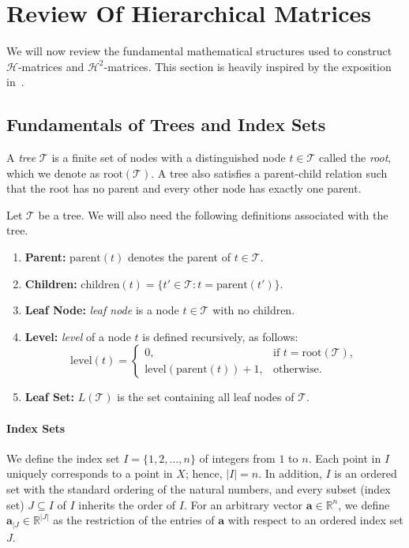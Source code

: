 \documentclass[final,3p,times]{elsarticle}
\newcommand{\mc}[1]{\mathcal{#1}}
\renewcommand{\vec}[1]{\boldsymbol{#1}}
\newcommand{\R}{\mathbb{R}}
\begin{document}
\section{Review Of Hierarchical Matrices}\label{sec:H_matrix_review}
We will now review the fundamental mathematical structures used to construct $\mc{H}$-matrices and $\mc{H}^{2}$-matrices. This section is heavily inspired by the  exposition in~\cite{borm2003introduction, BORM2025106190}.




\subsection{Fundamentals of Trees and Index Sets}\label{ssec:FOT}
A \textit{tree} $\mathcal{T}$ is a finite set of nodes with a distinguished node $t \in \mathcal{T}$ called the \textit{root}, which we denote as $\text{root}(\mc{T})$. A tree also satisfies a parent-child relation such that the root has no parent and every other node has exactly one parent. 

Let $\mathcal{T}$ be a tree. We will also need the following definitions associated with the tree. 
\begin{enumerate}
    \item \textbf{Parent:}  $\text{parent}(t)$ denotes the parent of $t \in \mc{T}$.
    \item \textbf{Children:} $\text{children}(t) = \{t' \in \mc{T}: t = \text{parent}(t')  \}$.
    \item \textbf{Leaf Node:} \textit{leaf node} is a node $t \in \mc{T}$ with no children.
    \item \textbf{Level:} \textit{level} of a node $t$ is defined recursively, as follows: \[
\text{level}(t) =
\begin{cases} 
    0, & \text{if } t = \text{root}(\mc{T}), \\
    \text{level}(\text{parent}(t)) + 1, & \text{otherwise}.
\end{cases}
\]
    \item \textbf{Leaf Set:} $L(\mc{T})$ is the set containing all leaf nodes of $\mc{T}$. 
\end{enumerate}

\paragraph{Index Sets}
We  define the index set $I = \{1, 2, \dots, n\}$ of integers from $1$ to $n$. Each point in $I$ uniquely corresponds to a point in ${X}$; hence,  $|I| = n$. In addition, $I$ is an ordered set with the standard ordering of the natural numbers, and every subset (index set) $J \subseteq I$ of $I$ inherits the order of $I$. For an arbitrary vector $\vec{a} \in \R^{n}$, we define $\vec{a}_{|J} \in \R^{|J|}$  as the restriction of the entries of $\vec{a}$ with respect to an ordered index set $J$.
\end{document}
